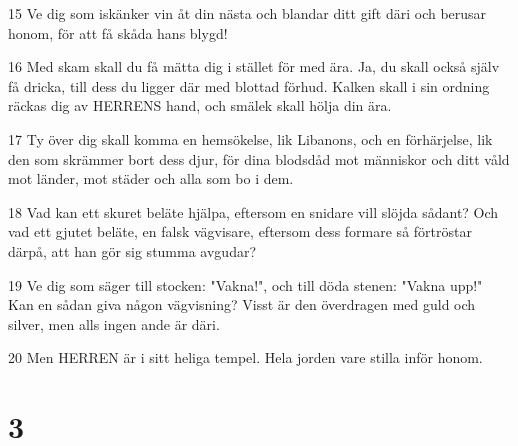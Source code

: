 \par 15 Ve dig som iskänker vin åt din nästa och blandar ditt gift däri och berusar honom, för att få skåda hans blygd!
\par 16 Med skam skall du få mätta dig i stället för med ära. Ja, du skall också själv få dricka, till dess du ligger där med blottad förhud. Kalken skall i sin ordning räckas dig av HERRENS hand, och smälek skall hölja din ära.
\par 17 Ty över dig skall komma en hemsökelse, lik Libanons, och en förhärjelse, lik den som skrämmer bort dess djur, för dina blodsdåd mot människor och ditt våld mot länder, mot städer och alla som bo i dem.
\par 18 Vad kan ett skuret beläte hjälpa, eftersom en snidare vill slöjda sådant? Och vad ett gjutet beläte, en falsk vägvisare, eftersom dess formare så förtröstar därpå, att han gör sig stumma avgudar?
\par 19 Ve dig som säger till stocken: "Vakna!", och till döda stenen: "Vakna upp!" Kan en sådan giva någon vägvisning? Visst är den överdragen med guld och silver, men alls ingen ande är däri.
\par 20 Men HERREN är i sitt heliga tempel. Hela jorden vare stilla inför honom.

\chapter{3}

